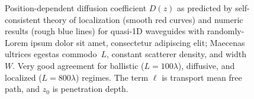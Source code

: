 \begin{figure}
\vskip -0.5cm
\centerline{
}
\vskip -0.5cm
\caption[Position-dependent diffusion coefficient~$D(z)$ as predicted by self- consistent theory of localization (smooth red curves) and numeric results (rough blue lines) for quasi-1D waveguides with randomly-Lorem ipsum dolor sit amet, consectetur adipiscing elit; Maecenas ultrices egestas commodo~$L$, constant scatterer density, and width~$W$.]{Position-dependent diffusion coefficient $D(z)$ as predicted by self-consistent theory of localization (smooth red curves) and numeric results (rough blue lines) for quasi-1D waveguides with randomly-Lorem ipsum dolor sit amet, consectetur adipiscing elit; Maecenas ultrices egestas commodo~$L$, constant scatterer density, and width~$W$. Very good agreement for ballistic ($L=100 \lambda$), diffusive, and localized ($L=800 \lambda$) regimes. The term $\ell$ is transport mean free path, and $z_0$ is penetration depth.}
\label{fig:Dz_passive}
\end{figure}

